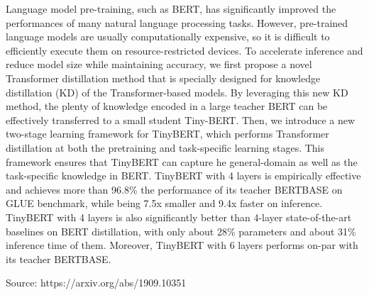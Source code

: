 \documentclass{article}
\begin{document}
Language model pre-training, such as BERT, has significantly improved the performances of many natural language processing tasks. However, pre-trained language models are usually computationally expensive, so it is difficult to efficiently execute them on resource-restricted devices. To accelerate inference and reduce model size while maintaining accuracy, we first propose a novel Transformer distillation method that is specially designed for knowledge distillation (KD) of the Transformer-based models. By leveraging this new KD method, the plenty of knowledge encoded in a large teacher BERT can be effectively transferred to a small student Tiny-BERT. Then, we introduce a new two-stage learning framework for TinyBERT, which performs Transformer distillation at both the pretraining and task-specific learning stages. This framework ensures that TinyBERT can capture he general-domain as well as the task-specific knowledge in BERT.
TinyBERT with 4 layers is empirically effective and achieves more than 96.8\% the performance of its teacher BERTBASE on GLUE benchmark, while being 7.5x smaller and 9.4x faster on inference. TinyBERT with 4 layers is also significantly better than 4-layer state-of-the-art baselines on BERT distillation, with only about 28\% parameters and about 31\% inference time of them. Moreover, TinyBERT with 6 layers performs on-par with its teacher BERTBASE.

Source: https://arxiv.org/abs/1909.10351
\end{document}
